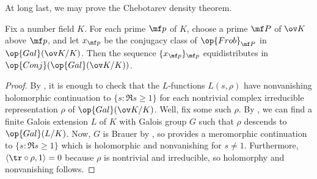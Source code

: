\documentclass[../thesis.tex]{subfiles}
\begin{document}
At long last, we may prove the Chebotarev density theorem.
\begin{theorem}
	Fix a number field $K$. For each prime $\mf p$ of $K$, choose a prime $\mf P$ of $\ov K$ above $\mf p$, and let $x_{\mf p}$ be the conjugacy class of $\op{Frob}_{\mf P}$ in $\op{Gal}(\ov K/K)$. Then the sequence $\{x_{\mf p}\}_{\mf p}$ equidistributes in $\op{Conj}(\op{Gal}(\ov K/K))$.
\end{theorem}
\begin{proof}
	By , it is enough to check that the $L$-functions $L(s,\rho)$ have nonvanishing holomorphic continuation to $\{s:\Re s\ge1\}$ for each nontrivial complex irreducible representation $\rho$ of $\op{Gal}(\ov K/K)$. Well, fix some such $\rho$. By , we can find a finite Galois extension $L$ of $K$ with Galois group $G$ such that $\rho$ descends to $\op{Gal}(L/K)$. Now, $G$ is Brauer by , so  provides a meromorphic continuation to $\{s:\Re s\ge1\}$ which is holomorphic and nonvanishing for $s\ne1$. Furthermore, $\langle{\tr}\circ\rho,1\rangle=0$ because $\rho$ is nontrivial and irreducible, so holomorphy and nonvanishing follows.
\end{proof}



\end{document}
